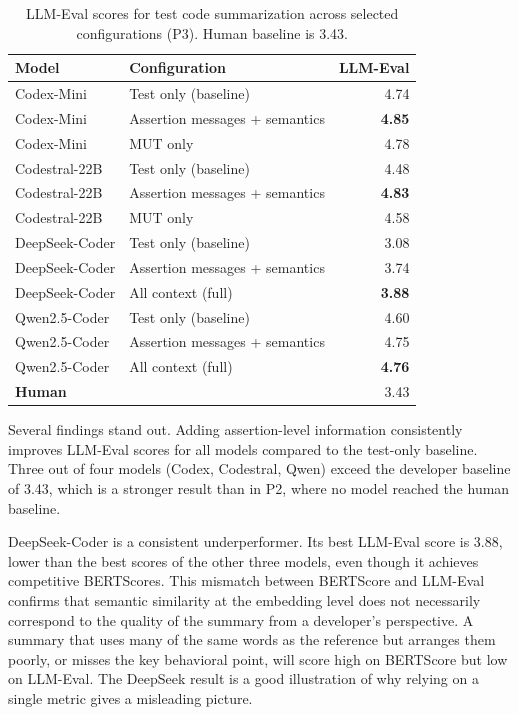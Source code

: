 \documentclass[
    pdftex,
    final,
    11pt,
    a4paper,
    parskip=false,
    oneside,
    footheight=0mm,
    footinclude=false,
    toc=bibliography
]{scrbook}
\begin{document}
\begin{table}[htbp]
\centering
\caption{LLM-Eval scores for test code summarization across selected configurations (P3). Human baseline is 3.43.}
\label{tab:p3-results}
\small
\begin{tabularx}{\linewidth}{llr}
\toprule
\textbf{Model} & \textbf{Configuration} & \textbf{LLM-Eval} \\
\midrule
Codex-Mini        & Test only (baseline)              & 4.74 \\
Codex-Mini        & Assertion messages + semantics    & \textbf{4.85} \\
Codex-Mini        & MUT only                          & 4.78 \\
\midrule
Codestral-22B     & Test only (baseline)              & 4.48 \\
Codestral-22B     & Assertion messages + semantics    & \textbf{4.83} \\
Codestral-22B     & MUT only                          & 4.58 \\
\midrule
DeepSeek-Coder    & Test only (baseline)              & 3.08 \\
DeepSeek-Coder    & Assertion messages + semantics    & 3.74 \\
DeepSeek-Coder    & All context (full)                & \textbf{3.88} \\
\midrule
Qwen2.5-Coder     & Test only (baseline)              & 4.60 \\
Qwen2.5-Coder     & Assertion messages + semantics    & 4.75 \\
Qwen2.5-Coder     & All context (full)                & \textbf{4.76} \\
\midrule
\textbf{Human}    &                                   & 3.43 \\
\bottomrule
\end{tabularx}
\end{table}

Several findings stand out. Adding assertion-level information consistently improves LLM-Eval scores for all models compared to the test-only baseline. Three out of four models (Codex, Codestral, Qwen) exceed the developer baseline of 3.43, which is a stronger result than in P2, where no model reached the human baseline.

DeepSeek-Coder is a consistent underperformer. Its best LLM-Eval score is 3.88, lower than the best scores of the other three models, even though it achieves competitive BERTScores. This mismatch between BERTScore and LLM-Eval confirms that semantic similarity at the embedding level does not necessarily correspond to the quality of the summary from a developer's perspective. A summary that uses many of the same words as the reference but arranges them poorly, or misses the key behavioral point, will score high on BERTScore but low on LLM-Eval. The DeepSeek result is a good illustration of why relying on a single metric gives a misleading picture.
\end{document}
